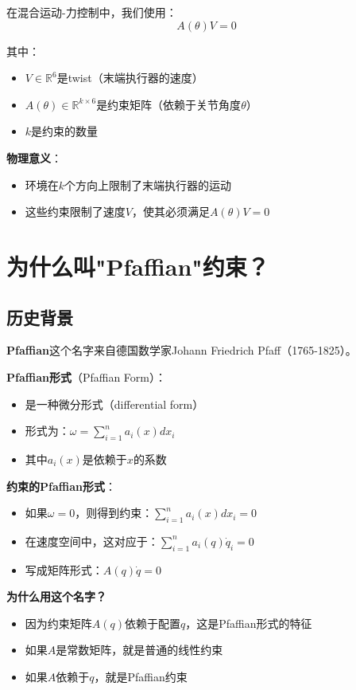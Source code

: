\documentclass[12pt,a4paper]{article}
\begin{document}
在混合运动-力控制中，我们使用：
\begin{equation}
A(\theta)V = 0
\end{equation}

其中：
\begin{itemize}
\item $V \in \mathbb{R}^6$是twist（末端执行器的速度）
\item $A(\theta) \in \mathbb{R}^{k \times 6}$是约束矩阵（依赖于关节角度$\theta$）
\item $k$是约束的数量
\end{itemize}

\textbf{物理意义}：
\begin{itemize}
\item 环境在$k$个方向上限制了末端执行器的运动
\item 这些约束限制了速度$V$，使其必须满足$A(\theta)V = 0$
\end{itemize}

\section{为什么叫"Pfaffian"约束？}

\subsection{历史背景}

\textbf{Pfaffian}这个名字来自德国数学家Johann Friedrich Pfaff（1765-1825）。

\textbf{Pfaffian形式}（Pfaffian Form）：
\begin{itemize}
\item 是一种微分形式（differential form）
\item 形式为：$\omega = \sum_{i=1}^n a_i(x) dx_i$
\item 其中$a_i(x)$是依赖于$x$的系数
\end{itemize}

\textbf{约束的Pfaffian形式}：
\begin{itemize}
\item 如果$\omega = 0$，则得到约束：$\sum_{i=1}^n a_i(x) dx_i = 0$
\item 在速度空间中，这对应于：$\sum_{i=1}^n a_i(q) \dot{q}_i = 0$
\item 写成矩阵形式：$A(q)\dot{q} = 0$
\end{itemize}

\textbf{为什么用这个名字？}
\begin{itemize}
\item 因为约束矩阵$A(q)$依赖于配置$q$，这是Pfaffian形式的特征
\item 如果$A$是常数矩阵，就是普通的线性约束
\item 如果$A$依赖于$q$，就是Pfaffian约束
\end{itemize}
\end{document}
